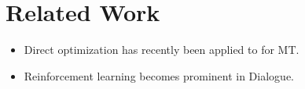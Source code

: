 \section{Related Work}
\begin{itemize}
\item Direct optimization has recently been applied to \proposed for MT. 
\item Reinforcement learning becomes prominent in Dialogue.
\end{itemize}